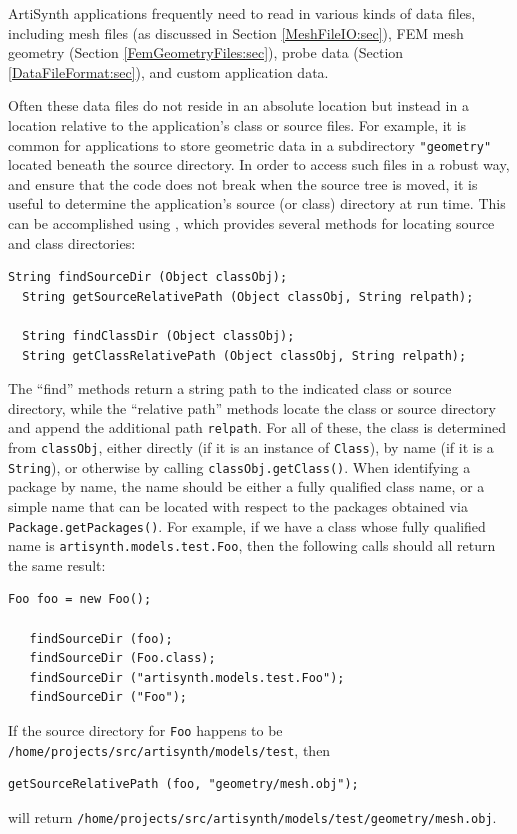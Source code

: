 ArtiSynth applications frequently need to read in various kinds of
data files, including mesh files (as discussed in Section
\ref{MeshFileIO:sec}), FEM mesh geometry (Section
\ref{FemGeometryFiles:sec}), probe data (Section
\ref{DataFileFormat:sec}), and custom application data.

Often these data files do not reside in an absolute location but
instead in a location relative to the application's class or source
files.  For example, it is common for applications to store geometric
data in a subdirectory {\tt "geometry"} located beneath the source
directory. In order to access such files in a robust way, and ensure
that the code does not break when the source tree is moved, it is
useful to determine the application's source (or class) directory at
run time. This can be accomplished using
, which provides several methods
for locating source and class directories:
%
\begin{lstlisting}[]
  String findSourceDir (Object classObj);
  String getSourceRelativePath (Object classObj, String relpath);

  String findClassDir (Object classObj);
  String getClassRelativePath (Object classObj, String relpath);
\end{lstlisting}
%
The ``find'' methods return a string path to the indicated class or
source directory, while the ``relative path'' methods locate the class
or source directory and append
the additional path {\tt relpath}.  For all of these, the class is
determined from {\tt classObj}, either directly (if it is an instance
of {\tt Class}), by name (if it is a {\tt String}), or otherwise by
calling {\tt classObj.getClass()}. When identifying a package by name,
the name should be either a fully qualified class name, or a simple
name that can be located with respect to the packages obtained via
{\tt Package.getPackages()}. For example, if we have a class whose
fully qualified name is {\tt artisynth.models.test.Foo}, then the
following calls should all return the same result:
%
\begin{lstlisting}[]
   Foo foo = new Foo();

   findSourceDir (foo);
   findSourceDir (Foo.class);
   findSourceDir ("artisynth.models.test.Foo");
   findSourceDir ("Foo");
\end{lstlisting}
%
If the source directory for {\tt Foo} happens to be {\tt
/home/projects/src/artisynth/models/test}, then
%
\begin{lstlisting}[]
   getSourceRelativePath (foo, "geometry/mesh.obj");
\end{lstlisting}
%
will return
{\tt /home/projects/src/artisynth/models/test/geometry/mesh.obj}.


